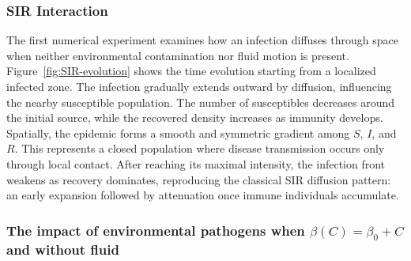 \documentclass[10pt,number,preprint,times]{elsarticle}
\numberwithin{equation}{section} %
\begin{document}
	
	
\subsubsection{SIR Interaction}

The first numerical experiment examines how an infection diffuses through space when neither environmental contamination nor fluid motion is present. Figure~\ref{fig:SIR-evolution} shows the time evolution starting from a localized infected zone. The infection gradually extends outward by diffusion, influencing the nearby susceptible population. The number of susceptibles decreases around the initial source, while the recovered density increases as immunity develops. Spatially, the epidemic forms a smooth and symmetric gradient among $S$, $I$, and $R$. This represents a closed population where disease transmission occurs only through local contact. After reaching its maximal intensity, the infection front weakens as recovery dominates, reproducing the classical SIR diffusion pattern: an early expansion followed by attenuation once immune individuals accumulate.


\subsubsection{The impact of environmental pathogens when $\beta(C)=\beta_0+C$ and without fluid}
\end{document}
